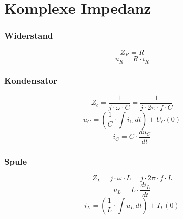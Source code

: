 



\section{Komplexe Impedanz}

\subsubsection{Widerstand}
\[ Z_R = R \]
\[ u_R = R \cdot i_R \]

\subsubsection{Kondensator}
\[ Z_c = \frac{1}{j \cdot \omega \cdot C} = \frac{1}{j \cdot 2 \pi \cdot f \cdot C} \]
\[ u_C = \left( \frac{1}{C} \cdot \int i_C ~ dt \right) + U_C(0) \]
\[ i_C = C \cdot \frac{du_C}{dt} \]

\subsubsection{Spule}
\[ Z_L = j \cdot \omega \cdot L = j \cdot 2 \pi \cdot f \cdot L \]
\[ u_L = L \cdot \frac{di_L}{dt} \]
\[ i_L = \left( \frac{1}{L} \cdot \int u_L ~ dt \right) + I_L(0) \]